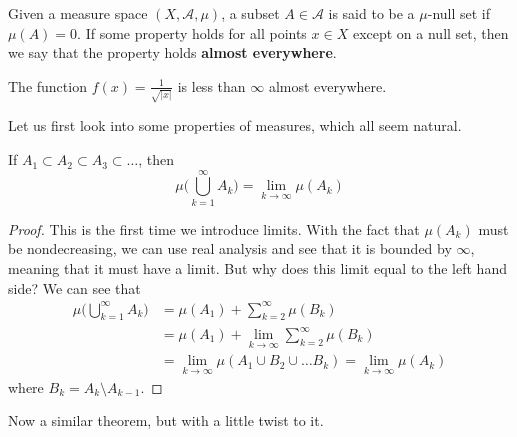   \begin{definition}
    Given a measure space $(X, \mathcal{A}, \mu)$, a subset $A \in \mathcal{A}$ is said to be a $\mu$-null set if $\mu(A) = 0$. If some property holds for all points $x \in X$ except on a null set, then we say that the property holds \textbf{almost everywhere}.
  \end{definition}

  \begin{example}
    The function $f(x) = \frac{1}{\sqrt{|x|}}$ is less than $\infty$ almost everywhere. 
  \end{example}

  Let us first look into some properties of measures, which all seem natural. 

  \begin{theorem}
    If $A_1 \subset A_2 \subset A_3 \subset \ldots$, then 
    \begin{equation}
      \mu\bigg( \bigcup_{k=1}^\infty A_k \bigg) = \lim_{k \rightarrow \infty} \mu(A_k)
    \end{equation}
  \end{theorem}
  \begin{proof}
    This is the first time we introduce limits. With the fact that $\mu(A_k)$ must be nondecreasing, we can use real analysis and see that it is bounded by $\infty$, meaning that it must have a limit. But why does this limit equal to the left hand side? We can see that 
    \begin{align}
      \mu\bigg( \bigcup_{k=1}^\infty A_k \bigg) & = \mu(A_1) + \sum_{k=2}^\infty \mu(B_k) \\
      & = \mu(A_1) + \lim_{k \rightarrow \infty} \sum_{k=2}^\infty \mu(B_k) \\
      & = \lim_{k \rightarrow \infty} \mu(A_1 \cup B_2 \cup \ldots B_k)  = \lim_{k \rightarrow \infty} \mu(A_k) 
    \end{align}
    where $B_k = A_k \setminus A_{k-1}$. 
  \end{proof}

  Now a similar theorem, but with a little twist to it. 

